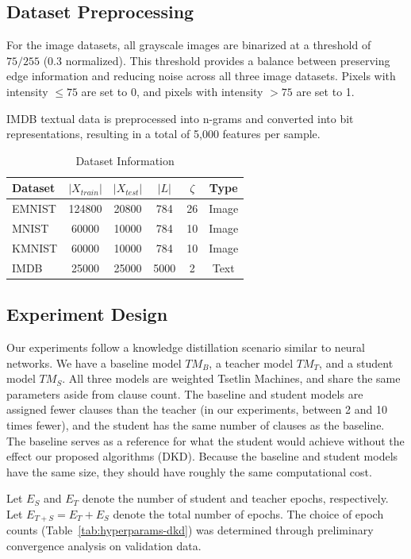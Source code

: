 \documentclass[sn-mathphys-num]{sn-jnl}%
\theoremstyle{thmstyleone}%
\theoremstyle{thmstyletwo}%
\theoremstyle{thmstylethree}%
\begin{document}
\subsection{Dataset Preprocessing}
For the image datasets, all grayscale images are binarized at a threshold of $75/255$ (0.3 normalized). This threshold provides a balance between preserving edge information and reducing noise across all three image datasets. Pixels with intensity $\leq 75$ are set to 0, and pixels with intensity $>75$ are set to 1.

IMDB textual data is preprocessed into n-grams and converted into bit representations, resulting in a total of 5,000 features per sample.

\begin{table}
	\centering
	\caption{Dataset Information}
	\begin{tabular}{l|ccccc}
		\hline
		Dataset & $|X_{train}|$ & $|X_{test}|$ & $|L|$ & $\zeta$ & Type\\
		\hline
		EMNIST & 124800 & 20800 & 784 & 26 & Image \\
		MNIST & 60000 & 10000 & 784 & 10 & Image \\
		KMNIST & 60000 & 10000 & 784 & 10 & Image \\
		IMDB & 25000 & 25000 & 5000 & 2 & Text \\
		\hline
	\end{tabular}
	\label{tab:dataset-size}
\end{table}

\subsection{Experiment Design}

Our experiments follow a knowledge distillation scenario similar to neural networks. We have a baseline model $TM_B$, a teacher model $TM_T$, and a student model $TM_S$. All three models are weighted Tsetlin Machines, and share the same parameters aside from clause count. The baseline and student models are assigned fewer clauses than the teacher (in our experiments, between 2 and 10 times fewer), and the student has the same number of clauses as the baseline. The baseline serves as a reference for what the student would achieve without the effect our proposed algorithms (DKD). Because the baseline and student models have the same size, they should have roughly the same computational cost.

Let $E_S$ and $E_T$ denote the number of student and teacher epochs, respectively. Let $E_{T+S} = E_T + E_S$ denote the total number of epochs. The choice of epoch counts (Table~\ref{tab:hyperparams-dkd}) was determined through preliminary convergence analysis on validation data.
\end{document}
